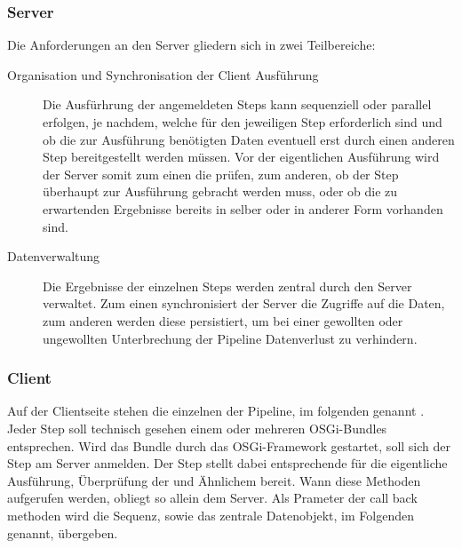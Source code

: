 \subsubsection{Server}
Die Anforderungen an den Server gliedern sich in zwei Teilbereiche:
\begin{description}
\item[Organisation und Synchronisation der Client Ausführung]
Die Ausfürhrung der angemeldeten Steps kann sequenziell oder
parallel erfolgen, je nachdem, welche  für den
jeweiligen Step erforderlich sind und ob die zur Ausführung benötigten Daten eventuell erst
durch einen anderen Step bereitgestellt werden müssen. Vor der eigentlichen
Ausführung wird der Server somit zum einen die 
prüfen, zum anderen, ob der Step überhaupt zur Ausführung
gebracht werden muss, oder ob die zu erwartenden Ergebnisse bereits in selber
oder in anderer Form vorhanden sind.
\item[Datenverwaltung] Die Ergebnisse der einzelnen Steps werden zentral durch
den Server verwaltet.
Zum einen synchronisiert der Server die Zugriffe auf die Daten, zum anderen
werden diese persistiert, um bei einer gewollten oder ungewollten Unterbrechung
der Pipeline Datenverlust zu verhindern.
\end{description}

\subsubsection{Client}
Auf der Clientseite stehen die einzelnen  der Pipeline, im
folgenden  genannt . Jeder Step soll technisch
gesehen einem oder mehreren OSGi-Bundles entsprechen.
Wird das Bundle durch das OSGi-Framework gestartet, soll sich der Step am Server
anmelden. Der Step stellt dabei entsprechende  für die
eigentliche Ausführung, Überprüfung der  und
Ähnlichem bereit.
Wann diese Methoden aufgerufen werden, obliegt so allein
dem Server.
Als Prameter der call back methoden wird die Sequenz, sowie das zentrale
Datenobjekt, im Folgenden   genannt,
übergeben.


